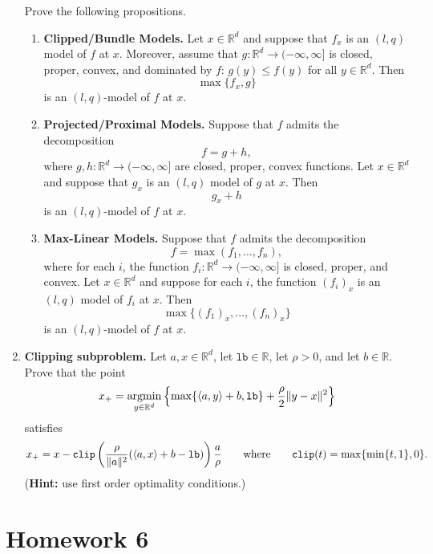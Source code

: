 \documentclass[12pt]{article}
\numberwithin{equation}{section}
\newcommand{\RR}{\mathbb{R}}
\newcommand{\modelell}{l}
\newcommand{\argmin}{\operatornamewithlimits{argmin}}
\theoremstyle{remark}
\DeclarePairedDelimiter{\dotp}{\langle}{\rangle}
\begin{document}
\begin{enumerate}
{Prove the following propositions. 
\begin{enumerate}
\item {\bf Clipped/Bundle Models.} Let $x \in \RR^d$ and suppose that $f_x$ is an $(\modelell, q)$ model of $f$ at $x$. Moreover, assume that $ g \colon\RR^d \rightarrow (-\infty, \infty]$ is closed, proper, convex, and dominated by $f$: $g(y) \leq f(y)$ for all $y \in \RR^d$. Then 
$$
\max\{f_x, g\}
$$
is an $(\modelell, q)$-model of $f$ at $x$.
\item {\bf Projected/Proximal Models.} Suppose that $f$ admits the decomposition
$$
f = g + h,
$$
where $g, h : \RR^d \rightarrow (-\infty, \infty]$ are closed, proper, convex functions.  
Let $x \in \RR^d$ and suppose that $g_x$ is an $(\modelell, q)$ model of $g$ at $x$.
Then 
$$
g_x + h
$$
is an $(\modelell, q)$-model of $f$ at $x$.
\item {\bf Max-Linear Models.} Suppose that $f$ admits the decomposition
$$
f = \max(f_1, \ldots, f_n),
$$
where for each $i$, the function $f_i: \RR^d \rightarrow (-\infty, \infty]$ is closed, proper, and convex.  
Let $x \in \RR^d$ and suppose for each $i$, the function $(f_i)_x$ is an $(\modelell, q)$ model of $f_i$ at $x$.
Then 
$$
 \max\{(f_1)_x, \ldots, (f_n)_x\}
$$
is an $(\modelell, q)$-model of $f$ at $x$.
\end{enumerate}
}
\item {\bf Clipping subproblem.}
{\rm 
\Coffeecup \Coffeecup Let $a, x \in \RR^d$, let {\rm $ \texttt{lb} \in \RR$}, let $\rho >0$, and let $b \in \RR$. Prove that the point
{\rm $$
x_+ = \argmin_{y \in \RR^d} \left\{ \max \{ \dotp{a,y} + b,  \texttt{lb}\} + \frac{\rho}{2}\|y - x\|^2 \right\}
$$}
satisfies 
$$
x_{+} = x - \texttt{clip}\left( \frac{\rho}{\|a\|^2} (\dotp{a, x} + b - \texttt{lb})\right) \frac{a}{\rho} \qquad \text{where} \qquad \texttt{clip}(t) = \max\{\min\{t,1\},0\}.%
$$
({\bf Hint:} use first order optimality conditions.)
}
\end{enumerate}

\newpage
\section{Homework 6}
\end{document}
